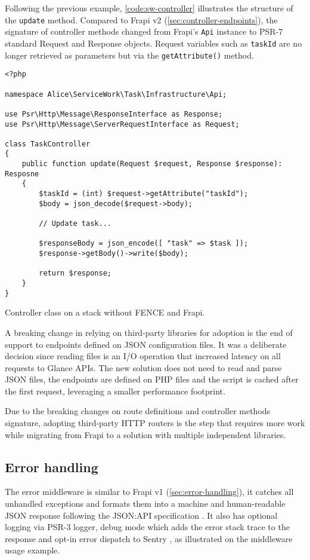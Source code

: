 Following the previous example, \autoref{code:sw-controller} illustrates the structure of the \texttt{update} method. Compared to Frapi v2 (\autoref{sec:controller-endpoints}), the signature of controller methods changed from Frapi's \texttt{Api} instance to PSR-7 standard Request and Response objects. Request variables such as \texttt{taskId} are no longer retrieved as parameters but via the \texttt{getAttribute()} method.

\begin{listing}[htbp]
\begin{verbatim}
<?php

namespace Alice\ServiceWork\Task\Infrastructure\Api;

use Psr\Http\Message\ResponseInterface as Response;
use Psr\Http\Message\ServerRequestInterface as Request;

class TaskController
{
	public function update(Request $request, Response $response): Resposne
	{
		$taskId = (int) $request->getAttribute("taskId");
		$body = json_decode($request->body);

		// Update task...

		$responseBody = json_encode([ "task" => $task ]);
		$response->getBody()->write($body);
	
		return $response;
	}
}
\end{verbatim}
\caption{Controller class on a stack without FENCE and Frapi.}
\label{code:sw-controller}
\end{listing}

A breaking change in relying on third-party libraries for adoption is the end of support to endpoints defined on JSON configuration files. It was a deliberate decision since reading files is an I/O operation that increased latency on all requests to Glance APIs. The new solution does not need to read and parse JSON files, the endpoints are defined on PHP files and the script is cached after the first request, leveraging a smaller performance footprint.

Due to the breaking changes on route definitions and controller methods signature, adopting third-party HTTP routers is the step that requires more work while migrating from Frapi to a solution with multiple independent libraries.

\subsection{Error handling}

The error middleware \cite{error-middleware} is similar to Frapi v1 (\autoref{sec:error-handling}), it catches all unhandled exceptions and formats them into a machine and human-readable JSON response following the JSON:API specification \cite{json-api-error}. It also has optional logging via PSR-3 logger, debug mode which adds the error stack trace to the response and opt-in error dispatch to Sentry \cite{sentry-about} \cite{sentry-php-sdk}, as illustrated on the middleware usage example.

